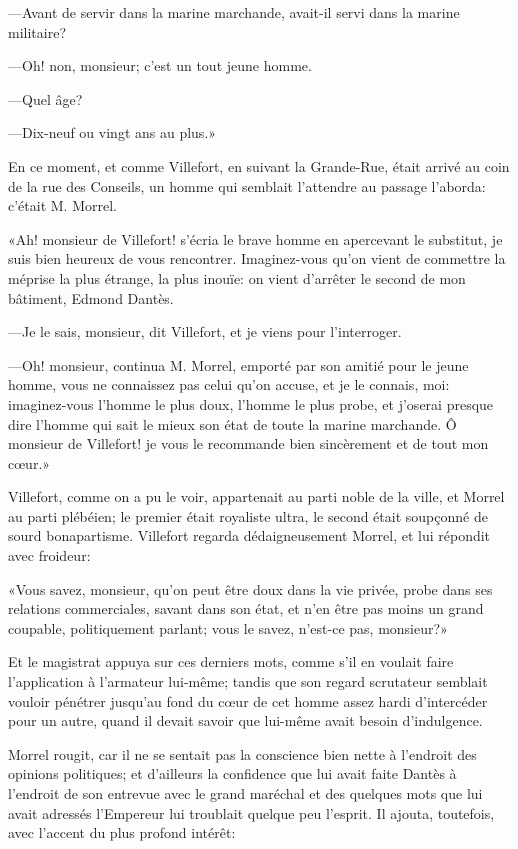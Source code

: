 —Avant de servir dans la marine marchande, avait-il servi dans la marine militaire?

—Oh! non, monsieur; c'est un tout jeune homme.

—Quel âge?

—Dix-neuf ou vingt ans au plus.»

En ce moment, et comme Villefort, en suivant la Grande-Rue, était arrivé au coin de la rue des Conseils, un homme qui semblait l'attendre au passage l'aborda: c'était M. Morrel.

«Ah! monsieur de Villefort! s'écria le brave homme en apercevant le substitut, je suis bien heureux de vous rencontrer. Imaginez-vous qu'on vient de commettre la méprise la plus étrange, la plus inouïe: on vient d'arrêter le second de mon bâtiment, Edmond Dantès.

—Je le sais, monsieur, dit Villefort, et je viens pour l'interroger.

—Oh! monsieur, continua M. Morrel, emporté par son amitié pour le jeune homme, vous ne connaissez pas celui qu'on accuse, et je le connais, moi: imaginez-vous l'homme le plus doux, l'homme le plus probe, et j'oserai presque dire l'homme qui sait le mieux son état de toute la marine marchande. Ô monsieur de Villefort! je vous le recommande bien sincèrement et de tout mon cœur.»

Villefort, comme on a pu le voir, appartenait au parti noble de la ville, et Morrel au parti plébéien; le premier était royaliste ultra, le second était soupçonné de sourd bonapartisme. Villefort regarda dédaigneusement Morrel, et lui répondit avec froideur:

«Vous savez, monsieur, qu'on peut être doux dans la vie privée, probe dans ses relations commerciales, savant dans son état, et n'en être pas moins un grand coupable, politiquement parlant; vous le savez, n'est-ce pas, monsieur?»

Et le magistrat appuya sur ces derniers mots, comme s'il en voulait faire l'application à l'armateur lui-même; tandis que son regard scrutateur semblait vouloir pénétrer jusqu'au fond du cœur de cet homme assez hardi d'intercéder pour un autre, quand il devait savoir que lui-même avait besoin d'indulgence.

Morrel rougit, car il ne se sentait pas la conscience bien nette à l'endroit des opinions politiques; et d'ailleurs la confidence que lui avait faite Dantès à l'endroit de son entrevue avec le grand maréchal et des quelques mots que lui avait adressés l'Empereur lui troublait quelque peu l'esprit. Il ajouta, toutefois, avec l'accent du plus profond intérêt:

